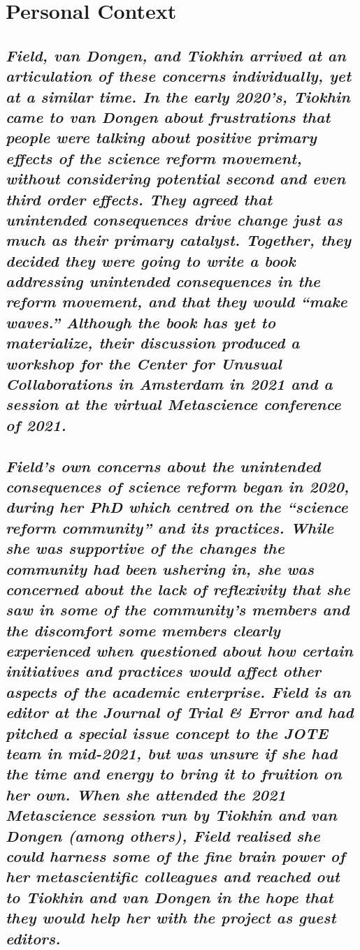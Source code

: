 \documentclass[authordate, editorial,noabstract]{jote-new-article}
\begin{document}
	\section{Personal Context}



	\subsection{\emph{Field, van Dongen, and Tiokhin arrived at an articulation of these concerns individually, yet at a similar time. In the early 2020's, Tiokhin came to van Dongen about frustrations that people were talking about positive primary effects of the science reform movement, without considering potential second and even third order effects. They agreed that unintended consequences drive change just as much as their primary catalyst. Together, they decided they were going to write a book addressing unintended consequences in the reform movement, and that they would “make waves.” Although the book has yet to materialize, their discussion produced a workshop for the Center for Unusual Collaborations in Amsterdam in 2021 and a session at the virtual Metascience conference of 2021. }}



	\subsection{\emph{Field's own concerns about the unintended consequences of science reform began in 2020, during her PhD which centred on the “science reform community” and its practices. While she was supportive of the changes the community had been ushering in, she was concerned about the lack of reflexivity that she saw in some of the community's members and the discomfort some members clearly experienced when questioned about how certain initiatives and practices would affect other aspects of the academic enterprise. Field is an editor at the Journal of Trial \& Error and had pitched a special issue concept to the JOTE team in mid-}\emph{2021, but}\emph{ was unsure if she had the time and energy to bring it to fruition on her own. When she attended the 2021 Metascience session run by Tiokhin and van Dongen (among others), Field realised she could harness some of the fine brain power of her metascientific colleagues and reached out to Tiokhin and van Dongen in the hope that they would help her with the project as guest editors. }}
\end{document}
